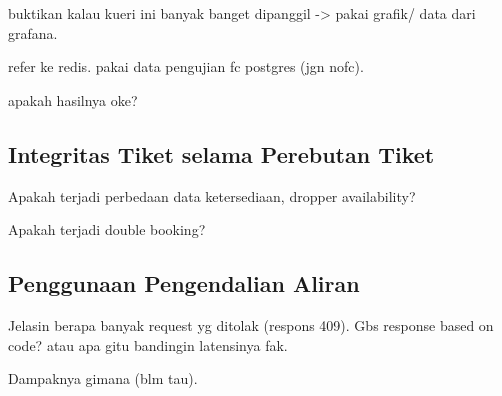 buktikan kalau kueri ini banyak banget dipanggil -> pakai grafik/ data dari grafana.

refer ke redis. pakai data pengujian fc postgres (jgn nofc).

apakah hasilnya oke?

\subsection{Integritas Tiket selama Perebutan Tiket}

Apakah terjadi perbedaan data ketersediaan, dropper availability?

Apakah terjadi double booking?

\subsection{Penggunaan Pengendalian Aliran}

Jelasin berapa banyak request yg ditolak (respons 409). Gbs response based on code? atau apa gitu bandingin latensinya fak.

Dampaknya gimana (blm tau).

